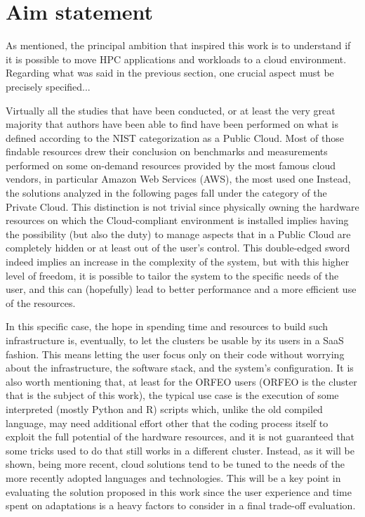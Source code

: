 \section{Aim statement}

As mentioned, the principal ambition that inspired this work is to understand if
it is possible to move HPC applications and workloads to a cloud environment.
Regarding what was said in the previous section, one crucial aspect must
be precisely specified...

Virtually all the studies that have been conducted, or at least
the very great majority that authors have been able to find have been performed
on what is defined according to the NIST categorization as a Public Cloud.
Most of those findable resources drew their conclusion on benchmarks and
measurements performed on some on-demand resources provided by the most famous
cloud vendors, in particular Amazon Web Services (AWS), the most used one
Instead, the solutions analyzed in the following pages fall under the category
of the Private Cloud.
This distinction is not trivial since physically owning the hardware resources
on which the Cloud-compliant environment is installed implies having the
possibility (but also the duty) to manage aspects that in a Public Cloud are
completely hidden or at least out of the user's control.
This double-edged sword indeed implies an increase in the complexity of the
system, but with this higher level of freedom, it is possible to tailor the
system to the specific needs of the user, and this can (hopefully) lead to
better performance and a more efficient use of the resources.

In this specific case, the hope in spending time and resources to build such
infrastructure is, eventually, to let the clusters be usable by its users in
a SaaS fashion. This means letting the user focus only on their code without
worrying about the infrastructure, the software stack, and the system's
configuration.
It is also worth mentioning that, at least for the ORFEO users (ORFEO is the
cluster that is the subject of this work), the typical use case is the execution
of some interpreted (mostly Python and R) scripts which, unlike the old compiled
language, may need additional effort other that the coding process itself to
exploit the full potential of the hardware resources, and it is not guaranteed
that some tricks used to do that still works in a different cluster.
Instead, as it will be shown, being more recent, cloud solutions tend to be
tuned to the needs of the more recently adopted languages and technologies.
This will be a key point in evaluating the solution proposed in this work since
the user experience and time spent on adaptations is a heavy factors to consider
in a final trade-off evaluation.


